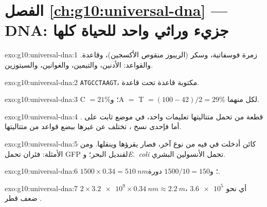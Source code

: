 \section*{الفصل \ref{ch:g10:universal-dna} --- DNA: جزيء وراثي واحد للحياة كلها}

\begin{solution}{exo:g10:universal-dna:1}
زمرة فوسفاتية، وسكر (الريبوز منقوص الأكسجين)، وقاعدة. والقواعد:
الأدنين، والتيمين، والغوانين، والسيتوزين.
\end{solution}

\begin{solution}{exo:g10:universal-dna:2}
\texttt{ATGCCTAAGT}، مكتوبة قاعدة تحت قاعدة.
\end{solution}

\begin{solution}{exo:g10:universal-dna:3}
C $= 21\%$؛ وA $=$ T $= (100 - 42)/2 = 29\%$ لكل منهما.
\end{solution}

\begin{solution}{exo:g10:universal-dna:4}
 قطعة من  تحمل متتاليتها تعليمات  واحد، في موضع ثابت
على . أما  فإحدى نسخ ، تختلف عن غيرها ببضع قواعد من
متتاليتها.
\end{solution}

\begin{solution}{exo:g10:universal-dna:5}
كائن أدخلت في  فيه  من نوع آخر، فصار يقرؤها وينقلها. ومن
الأمثلة: فئران تحمل  GFP لقنديل البحر؛ و\emph{E.~coli} تحمل
 الأنسولين البشري.
\end{solution}

\begin{solution}{exo:g10:universal-dna:6}
$1500 \times 0.34 = \qty{510}{nm}$؛ و$1500/10 = 150$ دورة.
\end{solution}

\begin{solution}{exo:g10:universal-dna:7}
$2 \times \num{3.2e9} \times \qty{0.34}{nm} \approx \qty{2.2}{m}$،
أي نحو $\num{3.6e5}$ ضعف قطر .
\end{solution}

